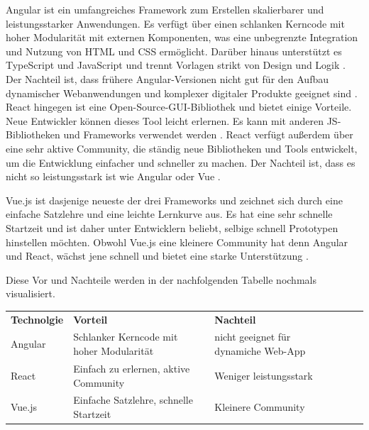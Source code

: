 Angular ist ein umfangreiches Framework zum Erstellen skalierbarer und leistungsstarker Anwendungen. Es verfügt über einen schlanken Kerncode mit hoher Modularität mit externen Komponenten, was eine unbegrenzte Integration und Nutzung von HTML und CSS ermöglicht. Darüber hinaus unterstützt es TypeScript und JavaScript und trennt Vorlagen strikt  von Design und Logik \cite{hosttest2021}. Der Nachteil ist, dass frühere Angular-Versionen nicht gut für den Aufbau dynamischer Webanwendungen und  komplexer digitaler Produkte  geeignet sind \cite{ichi2023}.\\

React hingegen ist eine Open-Source-GUI-Bibliothek und bietet einige Vorteile. Neue Entwickler können dieses Tool leicht erlernen. Es kann mit anderen JS-Bibliotheken und Frameworks verwendet werden \cite{softwaredeveloperindia2022}. React verfügt außerdem über eine sehr aktive Community, die ständig neue Bibliotheken und Tools entwickelt, um die Entwicklung einfacher und schneller zu machen. Der Nachteil ist, dass es  nicht so leistungsstark ist wie Angular oder Vue \cite{logrocket2021}.

Vue.js ist dasjenige neueste der drei Frameworks und zeichnet sich durch eine einfache Satzlehre und eine leichte Lernkurve aus. Es hat eine sehr schnelle Startzeit und ist daher unter Entwicklern beliebt, selbige schnell Prototypen hinstellen möchten\cite{logrocket2021}. Obwohl Vue.js eine kleinere Community hat denn Angular und React, wächst jene schnell und bietet eine starke Unterstützung \cite{codeinwp}.

Diese Vor und Nachteile werden in der nachfolgenden Tabelle nochmals visualisiert.
\begin{center}
\begin{table}[h]
	\begin{tabularx}{4cm}{|l|l|p{4.5 cm}|ll}
		\cline{1-3}
		\textbf{Technolgie} & \textbf{Vorteil}                         & \textbf{Nachteil}                                                &  &  \\ \cline{1-3}
		Angular             & Schlanker Kerncode mit hoher Modularität & nicht geeignet für dynamiche Web-App  &  &  \\ \cline{1-3}
		React               & Einfach zu erlernen, aktive Community    & Weniger leistungsstark         &  &  \\ \cline{1-3}
		Vue.js              & Einfache Satzlehre, schnelle Startzeit   & Kleinere Community             &  &  \\ \cline{1-3}
	\end{tabularx}
\end{table}
\end{center}

